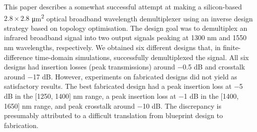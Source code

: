 

This paper describes a somewhat successful attempt at making a silicon-based $2.8 \times 2.8$ \si{\micro m^2} optical broadband wavelength demultiplexer using an inverse design strategy based on topology optimisation. The design goal was to demultiplex an infrared broadband signal into two output signals peaking at 1300 nm and 1550 nm wavelengths, respectively. We obtained six different designs that, in finite-difference time-domain simulations, successfully demultiplexed the signal.
 All six designs had insertion losses (peak transmissions) around $-$0.5 dB and crosstalk around $-$17 dB. However, experiments on fabricated designs did not yield as satisfactory results. The best fabricated design had a peak insertion loss at $-$5 dB in the [1250, 1400] nm range, a peak insertion loss at $-$1 dB in the [1400, 1650] nm range, and peak crosstalk around $-$10 dB. The discrepancy is presumably attributed to a difficult translation from blueprint design to fabrication.


